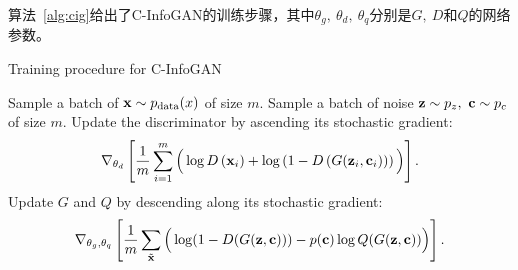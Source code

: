 算法~\ref{alg:cig}给出了C-InfoGAN的训练步骤，其中$\theta_g,~\theta_d,~\theta_q$分别是$G, ~D$和$Q$的网络参数。
\begin{algorithm}[htbp]
  \small
  \caption{Training procedure for C-InfoGAN}
  \label{alg:cig}
  \begin{algorithmic}[1]
      \State Sample a batch of $\mathbf{x} \sim p_{\text{data}}(x)$ of size $m$.
      \State Sample a batch of noise $\mathbf{z}\sim p_z, ~\mathbf{c}\sim p_c$ of size
      $m$.
      \State Update the discriminator by ascending its stochastic gradient:
      \[
        \nabla_{\theta_d} \left[ 
          \frac{1}{m} \sum_{i=1}^m \Big( 
            \log D\left(\mathbf{x}_i\right) + 
            \log\left( 1 - D\left( G(\mathbf{z}_i, \mathbf{c}_i) \right) \right)
          \Big)
        \right].
      \]
      \State Update $G$ and $Q$ by descending along its stochastic gradient:
      \[
        \nabla_{\theta_g,\theta_q} \left[ 
          \frac{1}{m} \sum_{\tilde{\mathbf{x}}} \Big(
            \log(1 - D(G(\mathbf{z},\mathbf{c}))) -
            p(\mathbf{c})\log Q(G(\mathbf{z}, \mathbf{c}))
          \Big)
        \right].
      \]
    \EndFor
  \end{algorithmic}
\end{algorithm}


